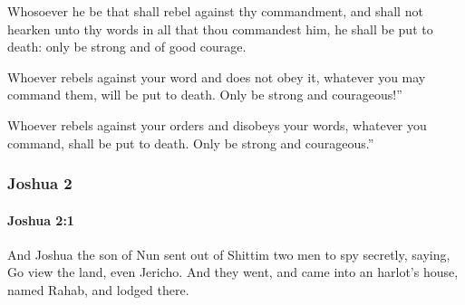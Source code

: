 			\begin{versebox}
					\item[BHS] 
					\item[ASV] Whosoever he be that shall rebel against thy commandment, and shall not hearken unto thy words in all that thou commandest him, he shall be put to death: only be strong and of good courage.
					\item[NIV] Whoever rebels against your word and does not obey it, whatever you may command them, will be put to death. Only be strong and courageous!”
					\item[NRSV] Whoever rebels against your orders and disobeys your words, whatever you command, shall be put to death. Only be strong and courageous.”
			\end{versebox}
	\subsubsection{Joshua 2} %
		\label{JOSHUA-2}

		\paragraph{Joshua 2:1} %
			\label{JOSHUA-2-1}

			And Joshua the son of Nun sent out of Shittim two men to spy secretly, saying, Go view the land, even Jericho. And they went, and came into an harlot’s house, named Rahab, and lodged there.

